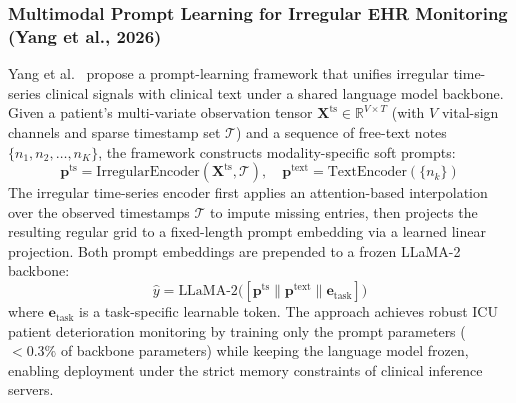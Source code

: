 \subsubsection{Multimodal Prompt Learning for Irregular EHR Monitoring (Yang et al., 2026)}
Yang et al.~\cite{Yang2026MultimodalIrregularEHR} propose a prompt-learning framework that unifies irregular time-series clinical signals with clinical text under a shared language model backbone. Given a patient's multi-variate observation tensor $\mathbf{X}^{\text{ts}} \in \mathbb{R}^{V \times T}$ (with $V$ vital-sign channels and sparse timestamp set $\mathcal{T}$) and a sequence of free-text notes $\{n_1, n_2, \ldots, n_K\}$, the framework constructs modality-specific soft prompts:
\begin{equation}
    \mathbf{p}^{\text{ts}} = \text{IrregularEncoder}(\mathbf{X}^{\text{ts}}, \mathcal{T}), \quad \mathbf{p}^{\text{text}} = \text{TextEncoder}(\{n_k\})
\end{equation}
The irregular time-series encoder first applies an attention-based interpolation over the observed timestamps $\mathcal{T}$ to impute missing entries, then projects the resulting regular grid to a fixed-length prompt embedding via a learned linear projection. Both prompt embeddings are prepended to a frozen LLaMA-2 backbone:
\begin{equation}
    \hat{y} = \text{LLaMA-2}\bigl([\mathbf{p}^{\text{ts}} \| \mathbf{p}^{\text{text}} \| \mathbf{e}_{\text{task}}]\bigr)
\end{equation}
where $\mathbf{e}_{\text{task}}$ is a task-specific learnable token. The approach achieves robust ICU patient deterioration monitoring by training only the prompt parameters ($<\!0.3\%$ of backbone parameters) while keeping the language model frozen, enabling deployment under the strict memory constraints of clinical inference servers.

